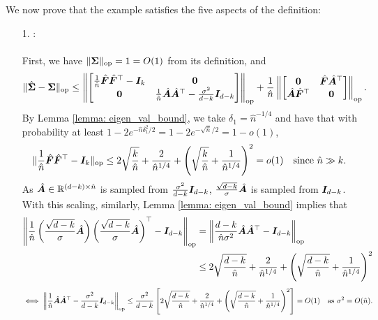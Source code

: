 We now prove that the example satisfies the five aspects of the definition: 
\begin{enumerate}
    \item[1. ] \bounded{}:  \\ \\
    First, we have $\lVert {\bm{\Sigma}} \rVert_{\mathrm{op}} = 1 = O(1)$ from its definition, and 
\begin{align} \label{eq:cov_difference}
    \lVert \hat{{\bm{\Sigma}}} - {\bm{\Sigma}} \rVert_{\mathrm{op}} \leq
    \left\|
    \begin{bmatrix}
        \frac{1}{\hat{n}}\hat{{\bm{F}}}\hat{{\bm{F}}}^\top - {\bm{I}}_k & \mathbf{0} \\
        \mathbf{0} & \frac{1}{\hat{n}}\hat{{\bm{A}}}\hat{{\bm{A}}}^\top - \frac{\sigma^2}{d-k}{\bm{I}}_{d-k} 
    \end{bmatrix}
    \right\|_{\text{op}} + 
    \frac{1}{\hat{n}}\left\|
    \begin{bmatrix}
        \mathbf{0} & \hat{{\bm{F}}}\hat{{\bm{A}}}^\top \\
        \hat{{\bm{A}}}\hat{{\bm{F}}}^\top & \mathbf{0}
    \end{bmatrix}
    \right\|_{\text{op}}. 
\end{align}
By Lemma \ref{lemma: eigen_val_bound}, we take $\delta_1 = \hat{n}^{-1/4}$ and have that with probability at least $1 - 2e^{-\hat{n}\delta_1^2/2} = 1 - 2e^{-\sqrt{\hat{n}}/2} = 1 - o(1)$,  
\begin{align*}
   \lVert \frac{1}{\hat{n}}\hat{{\bm{F}}}\hat{{\bm{F}}}^\top - {\bm{I}}_k \rVert_{\mathrm{op}} \leq 2\sqrt{\frac{k}{\hat{n}}} + \frac{2}{\hat{n}^{1/4}} + \left( \sqrt{\frac{k}{\hat{n}}} + \frac{1}{\hat{n}^{1/4}} \right)^2 = o(1) \quad \text{since $\hat{n} \gg k$}. 
\end{align*} 
As $\hat{{\bm{A}}} \in \mathbb{R}^{(d-k) \times \hat{n}}$ is sampled from $\frac{\sigma^2}{d-k}{\bm{I}}_{d-k}$, $\frac{\sqrt{d-k}}{\sigma}\hat{{\bm{A}}}$ is sampled from ${\bm{I}}_{d-k}$. With this scaling, similarly, Lemma \ref{lemma: eigen_val_bound} implies that
\begin{align*}
    \left\|\frac{1}{\hat{n}}\left( \frac{\sqrt{d-k}}{\sigma}\hat{{\bm{A}}} \right) \left(\frac{\sqrt{d-k}}{\sigma}\hat{{\bm{A}}} \right)^\top - {\bm{I}}_{d-k}\right\|_{\text{op}} & =
    \left\|\frac{d-k}{\hat{n}\sigma^2}\hat{{\bm{A}}}\hat{{\bm{A}}}^\top - {\bm{I}}_{d-k}\right\|_{\text{op}} \\
    & \leq 2\sqrt{\frac{d-k}{\hat{n}}} + \frac{2}{\hat{n}^{1/4}} + \left( \sqrt{\frac{d-k}{\hat{n}}} + \frac{1}{\hat{n}^{1/4}} \right)^2
\end{align*}
\begin{align*}
    \iff \left\|\frac{1}{\hat{n}}\hat{{\bm{A}}}\hat{{\bm{A}}}^\top - \frac{\sigma^2}{d-k}{\bm{I}}_{d-k}\right\|_{\text{op}} \leq \frac{\sigma^2}{d-k}\left[ 2\sqrt{\frac{d-k}{\hat{n}}} + \frac{2}{\hat{n}^{1/4}} + \left( \sqrt{\frac{d-k}{\hat{n}}} + \frac{1}{\hat{n}^{1/4}} \right)^2 \right] = O(1) \quad \text{as $\sigma^2 = O(\hat{n})$}. 
\end{align*}


\end{enumerate}
